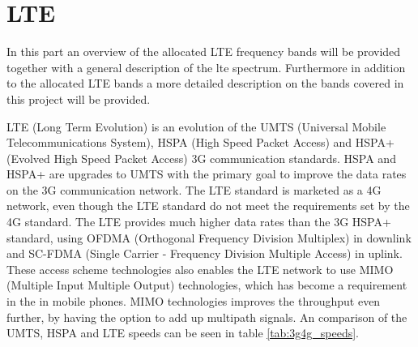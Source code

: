 \section{LTE}
In this part an overview of the allocated LTE frequency bands will be provided together with a general description of the lte spectrum.
Furthermore in addition to the allocated LTE bands a more detailed description on the bands covered in this project will be provided.

LTE (Long Term Evolution) is an evolution of the UMTS (Universal Mobile Telecommunications System), HSPA (High Speed Packet Access) and HSPA+ (Evolved High Speed Packet Access) 3G communication standards. HSPA and HSPA+ are upgrades to UMTS with the primary goal to improve the data rates on the 3G communication network. The LTE standard is marketed as a 4G network, even though the LTE standard do not meet the requirements set by the 4G standard.
The LTE provides much higher data rates than the 3G HSPA+ standard, using OFDMA (Orthogonal Frequency Division Multiplex) in downlink and SC-FDMA (Single Carrier - Frequency Division Multiple Access) in uplink. These access scheme technologies also enables the LTE network to use MIMO (Multiple Input Multiple Output) technologies, which has become a requirement in the in mobile phones.
MIMO technologies improves the throughput even further, by having the option to add up multipath signals. An comparison of the UMTS, HSPA and LTE speeds can be seen in table \ref{tab:3g4g_speeds}. \cite{radio2015electronics} 

